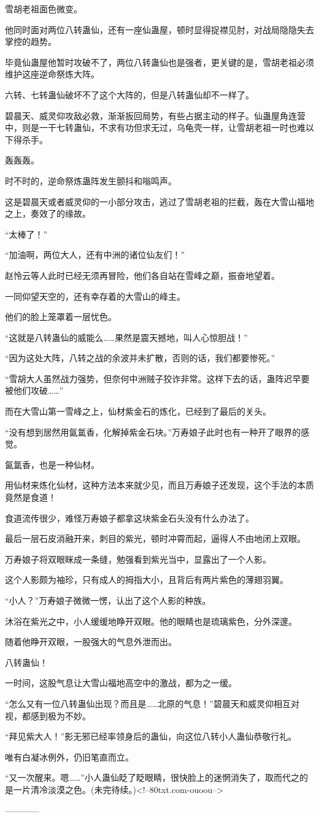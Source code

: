 \begin{this_body}
雪胡老祖面色微变。

他同时面对两位八转蛊仙，还有一座仙蛊屋，顿时显得捉襟见肘，对战局隐隐失去掌控的趋势。

毕竟仙蛊屋他暂时攻破不了，两位八转蛊仙也是强者，更关键的是，雪胡老祖必须维护这座逆命祭炼大阵。

六转、七转蛊仙破坏不了这个大阵的，但是八转蛊仙却不一样了。

碧晨天、威灵仰攻敌必救，渐渐扳回局势，有些占据主动的样子。仙蛊屋角连营中，则是一干七转蛊仙，不求有功但求无过，乌龟壳一样，让雪胡老祖一时也难以下得杀手。

轰轰轰。

时不时的，逆命祭炼蛊阵发生颤抖和嗡鸣声。

这是碧晨天或者威灵仰的一小部分攻击，逃过了雪胡老祖的拦截，轰在大雪山福地之上，奏效了的缘故。

“太棒了！”

“加油啊，两位大人，还有中洲的诸位仙友们！”

赵怜云等人此时已经无须再冒险，他们各自站在雪峰之巅，振奋地望着。

一同仰望天空的，还有幸存着的大雪山的峰主。

他们的脸上笼罩着一层忧色。

“这就是八转蛊仙的威能么……果然是震天撼地，叫人心惊胆战！”

“因为这处大阵，八转之战的余波并未扩散，否则的话，我们都要惨死。”

“雪胡大人虽然战力强势，但奈何中洲贼子狡诈非常。这样下去的话，蛊阵迟早要被他们攻破……”

而在大雪山第一雪峰之上，仙材紫金石的炼化，已经到了最后的关头。

“没有想到居然用氤氲香，化解掉紫金石块。”万寿娘子此时也有一种开了眼界的感觉。

氤氲香，也是一种仙材。

用仙材来炼化仙材，这种方法本来就少见，而且万寿娘子还发现，这个手法的本质竟然是食道！

食道流传很少，难怪万寿娘子都拿这块紫金石头没有什么办法了。

最后一层石皮消融开来，刺目的紫光，顿时冲霄而起，逼得人不由地闭上双眼。

万寿娘子将双眼眯成一条缝，勉强看到紫光当中，显露出了一个人影。

这个人影颇为袖珍，只有成人的拇指大小，且背后有两片紫色的薄翅羽翼。

“小人？”万寿娘子微微一愣，认出了这个人影的种族。

沐浴在紫光之中，小人缓缓地睁开双眼。他的眼睛也是琉璃紫色，分外深邃。

随着他睁开双眼，一股强大的气息外泄而出。

八转蛊仙！

一时间，这股气息让大雪山福地高空中的激战，都为之一缓。

“怎么又有一位八转蛊仙出现？而且是……北原的气息！”碧晨天和威灵仰相互对视，都感到极为不妙。

“拜见紫大人！”影无邪已经率领身后的蛊仙，向这位八转小人蛊仙恭敬行礼。

唯有白凝冰例外，仍旧笔直而立。

“又一次醒来。嗯……”小人蛊仙眨了眨眼睛，很快脸上的迷惘消失了，取而代之的是一片清冷淡漠之色。(未完待续。)<!--80txt.com-ouoou-->

------------

\end{this_body}


